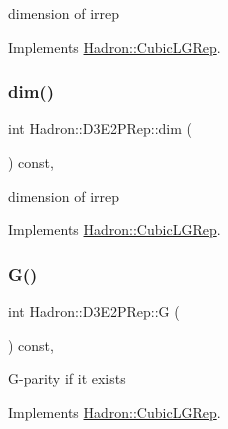 dimension of irrep 

Implements \mbox{\hyperlink{structHadron_1_1CubicLGRep_a3acbaea26503ed64f20df693a48e4cdd}{Hadron\+::\+Cubic\+L\+G\+Rep}}.

\mbox{\label{structHadron_1_1D3E2PRep_a8447155b89a2ca82aa11d902df9c3eb7}} 
\subsubsection{\texorpdfstring{dim()}{dim()}\hspace{0.1cm}{\footnotesize\ttfamily [3/3]}}
{\footnotesize\ttfamily int Hadron\+::\+D3\+E2\+P\+Rep\+::dim (\begin{DoxyParamCaption}{ }\end{DoxyParamCaption}) const\hspace{0.3cm}{\ttfamily [inline]}, {\ttfamily [virtual]}}

dimension of irrep 

Implements \mbox{\hyperlink{structHadron_1_1CubicLGRep_a3acbaea26503ed64f20df693a48e4cdd}{Hadron\+::\+Cubic\+L\+G\+Rep}}.

\mbox{\label{structHadron_1_1D3E2PRep_a2276ccf0f9c47ff521ba936da1f50e6d}} 
\subsubsection{\texorpdfstring{G()}{G()}\hspace{0.1cm}{\footnotesize\ttfamily [1/3]}}
{\footnotesize\ttfamily int Hadron\+::\+D3\+E2\+P\+Rep\+::G (\begin{DoxyParamCaption}{ }\end{DoxyParamCaption}) const\hspace{0.3cm}{\ttfamily [inline]}, {\ttfamily [virtual]}}

G-\/parity if it exists 

Implements \mbox{\hyperlink{structHadron_1_1CubicLGRep_ace26f7b2d55e3a668a14cb9026da5231}{Hadron\+::\+Cubic\+L\+G\+Rep}}.

\mbox{\label{structHadron_1_1D3E2PRep_a2276ccf0f9c47ff521ba936da1f50e6d}} 

